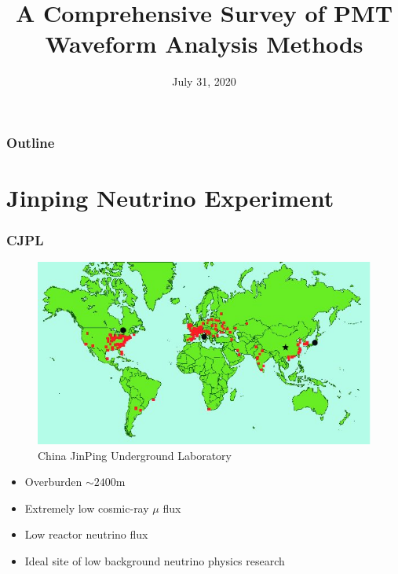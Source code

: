 \documentclass{beamer}
\title[Waveform Analysis]{A Comprehensive Survey of PMT Waveform Analysis Methods}
\date[DANCE]{July 31, 2020}
\begin{document}
\frame{\titlepage}

\begin{frame}
\frametitle{Outline}
\tableofcontents
\end{frame}

\section{Jinping Neutrino Experiment}
\begin{frame}
\frametitle{CJPL}
\begin{figure}
    \centering
    \caption{China JinPing Underground Laboratory}
    \includegraphics[width=0.65\linewidth]{img/WorldMap.jpg}
\end{figure}
\begin{itemize}
    \item Overburden $\sim2400\mathrm{m}$
    \item Extremely low cosmic-ray $\mu$ flux
    \item Low reactor neutrino flux
    \item Ideal site of low background neutrino physics research
\end{itemize}
\end{frame}
\end{document}
